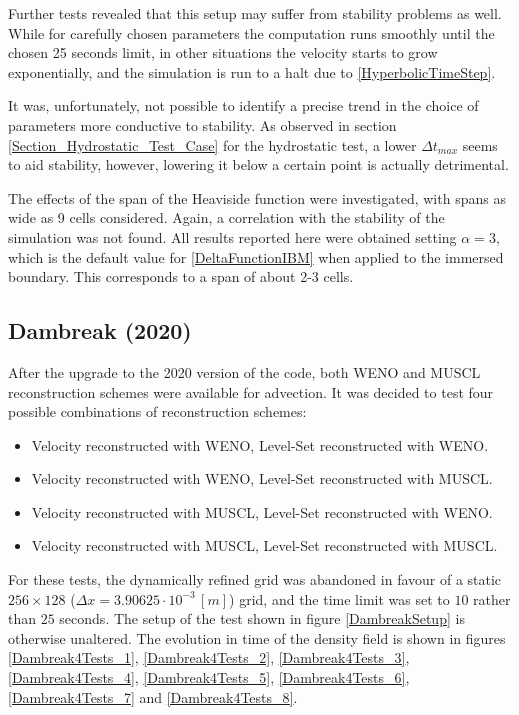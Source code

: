 \documentclass[11pt, a4paper, oneside, openany]{book}
\begin{document}
Further tests revealed that this setup may suffer from stability problems as well. While for carefully chosen parameters the computation runs smoothly until the chosen 25 seconds limit, in other situations the velocity starts to grow exponentially, and the simulation is run to a halt due to \eqref{HyperbolicTimeStep}.\par
It was, unfortunately, not possible to identify a precise trend in the choice of parameters more conductive to stability. As observed in section \ref{Section_Hydrostatic_Test_Case} for the hydrostatic test, a lower $\Delta t_{max}$ seems to aid stability, however, lowering it below a certain point is actually detrimental.\par
The effects of the span of the Heaviside function were investigated, with spans as wide as 9 cells considered. Again, a correlation with the stability of the simulation was not found. All results reported here were obtained setting $\alpha=3$, which is the default value for \eqref{DeltaFunctionIBM} when applied to the immersed boundary. This corresponds to a span of about 2-3 cells.
\subsection{Dambreak (2020)}\label{Section_Dambreak_2020}
After the upgrade to the 2020 version of the code, both WENO and MUSCL reconstruction schemes were available for advection. It was decided to test four possible combinations of reconstruction schemes:
\begin{itemize}
	\item Velocity reconstructed with WENO, Level-Set reconstructed with WENO.
	\item Velocity reconstructed with WENO, Level-Set reconstructed with MUSCL.
	\item Velocity reconstructed with MUSCL, Level-Set reconstructed with WENO.
	\item Velocity reconstructed with MUSCL, Level-Set reconstructed with MUSCL.
\end{itemize}
For these tests, the dynamically refined grid was abandoned in favour of a static $256\times128$ ($\Delta x = 3.90625\cdot 10^{-3}\,[m]$) grid, and the time limit was set to $10$ rather than $25$ seconds. The setup of the test shown in figure \ref{DambreakSetup} is otherwise unaltered. The evolution in time of the density field is shown in figures \ref{Dambreak4Tests_1}, \ref{Dambreak4Tests_2}, \ref{Dambreak4Tests_3}, \ref{Dambreak4Tests_4}, \ref{Dambreak4Tests_5}, \ref{Dambreak4Tests_6}, \ref{Dambreak4Tests_7} and \ref{Dambreak4Tests_8}.
\end{document}
